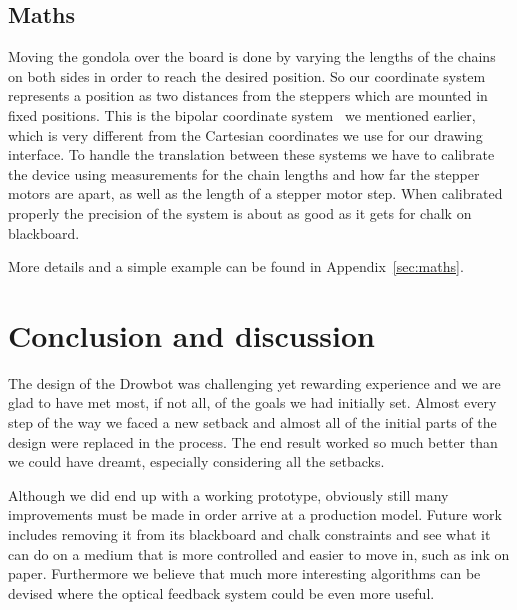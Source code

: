\documentclass[a4paper,10pt]{article}
\begin{document}
\subsection{Maths}
Moving the gondola over the board is done by varying the lengths of the
chains on both sides in order to reach the desired position.
So our coordinate system represents a position as two distances from
the steppers which are mounted in fixed positions.
This is the bipolar coordinate system~\cite{bipolar} we mentioned earlier,
which is very different from the Cartesian coordinates we use for our
drawing interface.
To handle the translation between these systems we have to calibrate
the device using measurements for the chain lengths and how far the
stepper motors are apart, as well as the length of a stepper motor
step.
When calibrated properly the precision of the system is about as good
as it gets for chalk on blackboard.

More details and a simple example can be found in Appendix~\ref{sec:maths}.

\section{Conclusion and discussion}
\label{sec:conclusion}




The design of the Drowbot was challenging yet rewarding experience
and we are glad to have met most, if not all, of the goals we had initially set.
Almost every step of the way we faced a new setback and almost all
of the initial parts of the design were replaced in the process.
The end result worked so much better than we could have dreamt,
especially considering all the setbacks.

Although we did end up with a working prototype,
obviously still many improvements must be made in order arrive at a production model.
Future work includes removing it from its blackboard and chalk
constraints and see what it can do on a medium that is
more controlled and easier to move in, such as ink on paper.
Furthermore we believe that much more interesting algorithms can be devised
where the optical feedback system could be even more useful.
\end{document}
